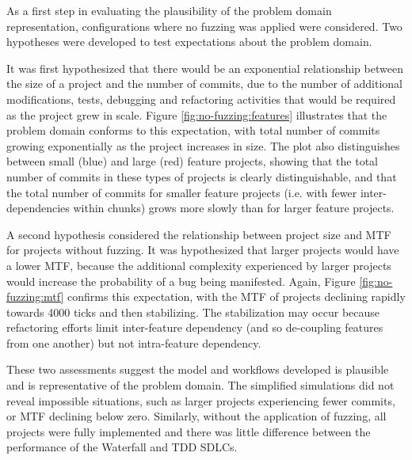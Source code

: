 \documentclass{llncs}
\begin{document}

As a first step in evaluating the plausibility of the problem domain representation, configurations where no fuzzing was
applied were considered.  Two hypotheses were developed to test expectations about the problem domain.

It was first hypothesized that there would be an exponential relationship between the size of a project and the number
of commits, due to the number of additional modifications, tests, debugging and refactoring activities that would be
required as the project grew in scale.  Figure \ref{fig:no-fuzzing:features} illustrates that the problem domain
conforms to this expectation, with total number of commits growing exponentially as the project increases in size.  The
plot also distinguishes between small (blue) and large (red) feature projects, showing that the total number of commits
in these types of projects is clearly distinguishable, and that the total number of commits for smaller feature projects
(i.e. with fewer inter-dependencies within chunks) grows more slowly than for larger feature projects.

A second hypothesis considered the relationship between project size and MTF for projects without fuzzing. It was
hypothesized that larger projects would have a lower MTF, because the additional complexity experienced by larger
projects would increase the probability of a bug being manifested.  Again, Figure \ref{fig:no-fuzzing:mtf} confirms this
expectation, with the MTF of projects declining rapidly towards 4000 ticks and then stabilizing.  The stabilization may
occur because refactoring efforts limit inter-feature dependency (and so de-coupling features from one another) but not
intra-feature dependency.

These two assessments suggest the model and workflows developed is plausible and is representative of the problem
domain.  The simplified simulations did not reveal impossible situations, such as larger projects experiencing fewer
commits, or MTF declining below zero.  Similarly, without the application of fuzzing, all projects were fully
implemented and there was little difference between the performance of the Waterfall and TDD SDLCs.
\end{document}
